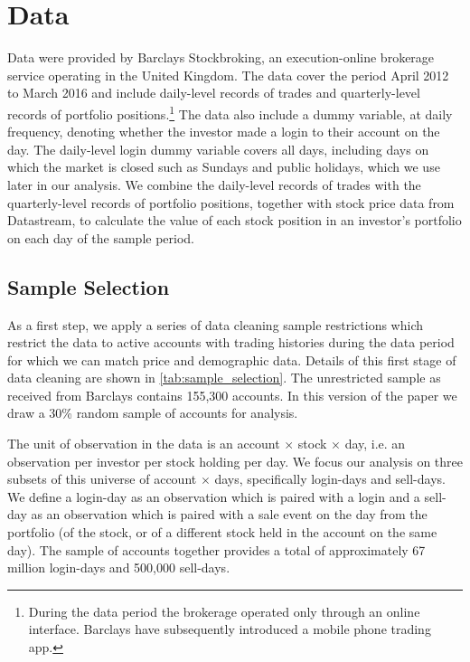 \section{Data}

Data were provided by Barclays Stockbroking, an execution-online brokerage service operating in the United Kingdom. The data cover the period April 2012 to March 2016 and include daily-level records of trades and quarterly-level records of portfolio positions.\footnote{During the data period the brokerage operated only through an online interface. Barclays have subsequently introduced a mobile phone trading app.} The data also include a dummy variable, at daily frequency, denoting whether the investor made a login to their account on the day. The daily-level login dummy variable covers all days, including days on which the market is closed such as Sundays and public holidays, which we use later in our analysis. We combine the daily-level records of trades with the quarterly-level records of portfolio positions, together with stock price data from Datastream, to calculate the value of each stock position in an investor's portfolio on each day of the sample period.

\subsection{Sample Selection}

As a first step, we apply a series of data cleaning sample restrictions which restrict the data to active accounts with trading histories during the data period for which we can match price and demographic data. Details of this first stage of data cleaning are shown in \ref{tab:sample_selection}. The unrestricted sample as received from Barclays contains 155,300 accounts. In this version of the paper we draw a 30\% random sample of accounts for analysis. 

The unit of observation in the data is an account $\times$ stock $\times$ day, i.e. an observation per investor per stock holding per day. We focus our analysis on three subsets of this universe of account $\times$ days, specifically login-days and sell-days. We define a login-day as an observation which is paired with a login and a sell-day as an observation which is paired with a sale event on the day from the portfolio (of the stock, or of a different stock held in the account on the same day). The sample of accounts together provides a total of approximately 67 million login-days and 500,000 sell-days.

